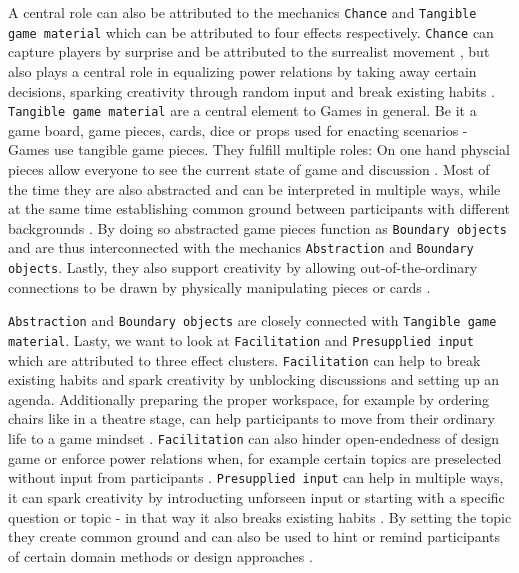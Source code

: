 \documentclass[draft,twoside]{vutinfth}
\begin{document}
        A central role can also be attributed to the mechanics \lstinline|Chance| and \lstinline|Tangible game material| which can be attributed 
        to four effects respectively. 
        \lstinline|Chance| can capture players by surprise and be attributed to the surrealist movement \cite{brandtDesigningExploratoryDesign2006}, 
        but also plays a central role in equalizing power relations by taking away certain decisions, sparking creativity through random input 
        and break existing habits \cite{hatamiFacilitatingServiceInteractions2016,kjaersgaardDesignGamesFieldwork2021,bunaesRulesPlayBalance2024}. 
        \lstinline|Tangible game material| are a central element to Games in general. Be it a game board, game pieces, cards, dice or props used 
        for enacting scenarios - Games use tangible game pieces. They fulfill multiple roles: On one hand physcial pieces allow everyone 
        to see the current state of game and discussion \cite{brandtFacilitatingCollaborationDesign2004a,eriksenTakingDesignGames2014,gudiksenExplicatingStakeholderCriteria2017}. 
        Most of the time they are also abstracted and can be interpreted in multiple ways, while at the same time establishing common 
        ground between participants with different backgrounds \cite{brandtDesigningExploratoryDesign2006}. By doing so abstracted game 
        pieces function as \lstinline|Boundary objects| and are thus interconnected with the mechanics \lstinline|Abstraction| and \lstinline|Boundary objects|.
        Lastly, they also support creativity by allowing out-of-the-ordinary connections to be drawn by physically manipulating pieces or cards 
        \cite{hatamiFacilitatingServiceInteractions2016,nymarkernstsenTechnologyCardsDesign2023}.

        \lstinline|Abstraction| and \lstinline|Boundary objects| are closely connected with \lstinline|Tangible game material|.  
        Lasty, we want to look at \lstinline|Facilitation| and \lstinline|Presupplied input| which are attributed to three effect clusters. 
        \lstinline|Facilitation| can help to break existing habits and spark creativity by unblocking discussions and setting up an agenda. 
        Additionally preparing the proper workspace, for example by ordering chairs like in a theatre stage, can help participants to move 
        from their ordinary life to a game mindset \cite{brandtFacilitatingCollaborationDesign2004a,bunaesRulesPlayBalance2024}. 
        \lstinline|Facilitation| can also hinder open-endedness of design game or enforce power relations when, for example certain topics are 
        preselected without input from participants \cite{eriksenTakingDesignGames2014}.
        \lstinline|Presupplied input| can help in multiple ways, it can spark creativity by introducting unforseen input or starting with 
        a specific question or topic \cite{brandtDesigningExploratoryDesign2006,bunaesRulesPlayBalance2024} - in that way it also breaks 
        existing habits \cite{bunaesRulesPlayBalance2024}. By setting the topic they create common ground and can also be used to hint or 
        remind participants of certain domain methods or design approaches \cite{royCardbasedDesignTools2019, nymarkernstsenTechnologyCardsDesign2023}. 
\end{document}
